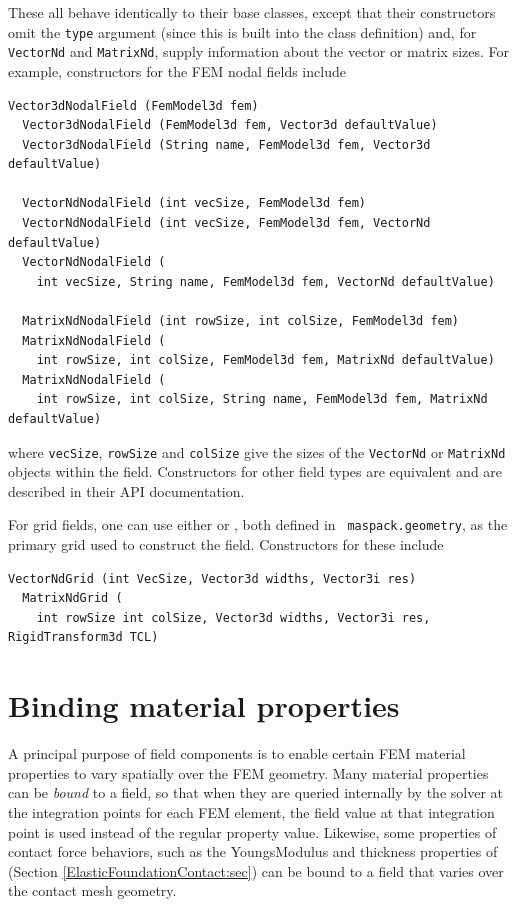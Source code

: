 %
These all behave identically to their base classes,
except that their constructors omit the {\tt type} argument (since
this is built into the class definition) and, for {\tt VectorNd} and
{\tt MatrixNd}, supply information about the vector or matrix sizes.
For example, constructors for the FEM nodal fields include
%
\begin{lstlisting}[]
  Vector3dNodalField (FemModel3d fem)
  Vector3dNodalField (FemModel3d fem, Vector3d defaultValue)
  Vector3dNodalField (String name, FemModel3d fem, Vector3d defaultValue)

  VectorNdNodalField (int vecSize, FemModel3d fem)
  VectorNdNodalField (int vecSize, FemModel3d fem, VectorNd defaultValue)
  VectorNdNodalField (
    int vecSize, String name, FemModel3d fem, VectorNd defaultValue)

  MatrixNdNodalField (int rowSize, int colSize, FemModel3d fem)
  MatrixNdNodalField (
    int rowSize, int colSize, FemModel3d fem, MatrixNd defaultValue)
  MatrixNdNodalField (
    int rowSize, int colSize, String name, FemModel3d fem, MatrixNd defaultValue)
\end{lstlisting}
%
where {\tt vecSize}, {\tt rowSize} and {\tt colSize} give the sizes of
the {\tt VectorNd} or {\tt MatrixNd} objects within the
field. Constructors for other field types are equivalent and are described
in their API documentation.

For grid fields, one can use either
 or
, both defined in {\tt
maspack.geometry}, as the primary grid used to construct the
field. Constructors for these include
%
\begin{lstlisting}[]
  VectorNdGrid (int VecSize, Vector3d widths, Vector3i res)
  MatrixNdGrid (
    int rowSize int colSize, Vector3d widths, Vector3i res, RigidTransform3d TCL)
\end{lstlisting}
%

\section{Binding material properties}
\label{sec:fieldBinding}

A principal purpose of field components is to enable certain FEM
material properties to vary spatially over the FEM geometry.  Many
material properties can be {\it bound} to a field, so that when they
are queried internally by the solver at the integration points for
each FEM element, the field value at that integration point is used
instead of the regular property value. Likewise, some
properties of contact force behaviors, such as
the {\sf YoungsModulus} and {\sf thickness} properties of
(Section \ref{ElasticFoundationContact:sec}) can be bound to a field
that varies over the contact mesh geometry.

